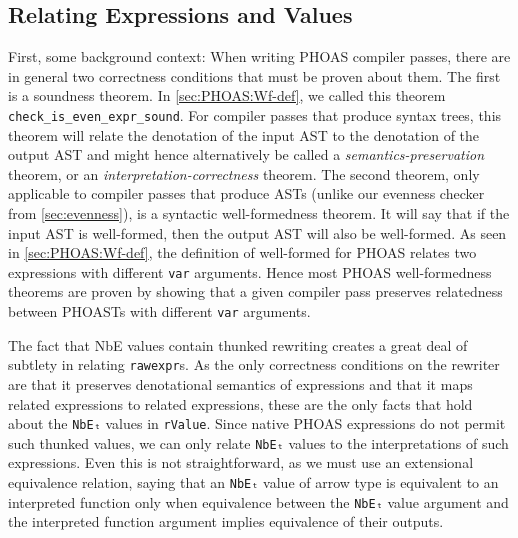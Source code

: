 \subsection{Relating Expressions and Values}\label{sec:rewriting-more:values-and-expressions}
First, some background context:
When writing PHOAS compiler passes, there are in general two correctness conditions that must be proven about them.
The first is a soundness theorem.
In \autoref{sec:PHOAS:Wf-def}, we called this theorem \texttt{check_is_even_expr_sound}.
For compiler passes that produce syntax trees, this theorem will relate the denotation of the input AST to the denotation of the output AST and might hence alternatively be called a \emph{semantics-preservation} theorem, or an \emph{interpretation-correctness} theorem.
The second theorem, only applicable to compiler passes that produce ASTs (unlike our evenness checker from \autoref{sec:evenness}), is a syntactic well-formedness theorem.
It will say that if the input AST is well-formed, then the output AST will also be well-formed.
As seen in \autoref{sec:PHOAS:Wf-def}, the definition of well-formed for PHOAS relates two expressions with different \texttt{var} arguments.
Hence most PHOAS well-formedness theorems are proven by showing that a given compiler pass preserves relatedness between PHOASTs with different \texttt{var} arguments.

The fact that NbE values contain thunked rewriting creates a great deal of subtlety in relating \texttt{rawexpr}s.
As the only correctness conditions on the rewriter are that it preserves denotational semantics of expressions and that it maps related expressions to related expressions, these are the only facts that hold about the \texttt{NbEₜ} values in \texttt{rValue}.
Since native PHOAS expressions do not permit such thunked values, we can only relate \texttt{NbEₜ} values to the interpretations of such expressions.
Even this is not straightforward, as we must use an extensional equivalence relation, saying that an \texttt{NbEₜ} value of arrow type is equivalent to an interpreted function only when equivalence between the \texttt{NbEₜ} value argument and the interpreted function argument implies equivalence of their outputs.

